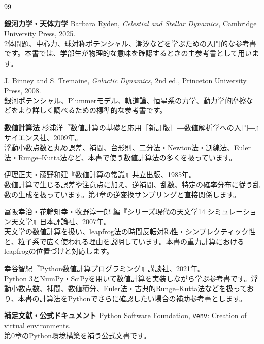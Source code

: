 \begin{thebibliography}{99}

\item[]\textbf{銀河力学・天体力学}
Barbara Ryden, \textit{Celestial and Stellar Dynamics}, Cambridge University Press, 2025.\\
2体問題、中心力、球対称ポテンシャル、潮汐などを学ぶための入門的な参考書です。本書では、学部生が物理的な意味を確認するときの主参考書として用います。

J. Binney and S. Tremaine, \textit{Galactic Dynamics}, 2nd ed., Princeton University Press, 2008.\\
銀河ポテンシャル、Plummerモデル、軌道論、恒星系の力学、動力学的摩擦などをより詳しく調べるための標準的な参考書です。

\item[]\textbf{数値計算法}
杉浦洋『数値計算の基礎と応用［新訂版］―数値解析学への入門―』サイエンス社、2009年。\\
浮動小数点数と丸め誤差、補間、台形則、二分法・Newton法・割線法、Euler法・Runge--Kutta法など、本書で使う数値計算法の多くを扱っています。

伊理正夫・藤野和建『数値計算の常識』共立出版、1985年。\\
数値計算で生じる誤差や注意点に加え、逆補間、乱数、特定の確率分布に従う乱数の生成を扱っています。第4章の逆変換サンプリングと直接関係します。

冨阪幸治・花輪知幸・牧野淳一郎 編『シリーズ現代の天文学14 シミュレーション天文学』日本評論社、2007年。\\
天文学の数値計算を扱い、leapfrog法の時間反転対称性・シンプレクティック性と、粒子系で広く使われる理由を説明しています。本書の重力計算におけるleapfrogの位置づけと対応します。

幸谷智紀『Python数値計算プログラミング』講談社、2021年。\\
Python 3とNumPy・SciPyを用いて数値計算を実装しながら学ぶ参考書です。浮動小数点数、補間、数値積分、Euler法・古典的Runge--Kutta法などを扱っており、本書の計算法をPythonでさらに確認したい場合の補助参考書とします。

\item[]\textbf{補足文献・公式ドキュメント}
Python Software Foundation, \href{https://docs.python.org/3/library/venv.html}{\texttt{venv}: Creation of virtual environments}.\\
第0章のPython環境構築を補う公式文書です。


\end{thebibliography}

